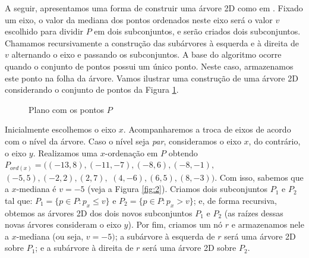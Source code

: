 A seguir, apresentamos uma forma de construir uma árvore 2D como em \cite{cg08}.
Fixado um eixo, o valor da mediana dos pontos ordenados neste eixo será o valor $v$ escolhido para dividir $P$ em dois subconjuntos, e serão criados dois subconjuntos. Chamamos recursivamente a construção das subárvores à esquerda e à direita de $v$ alternando o eixo e passando os subconjuntos. A base do algoritmo ocorre quando o conjunto de pontos possui um único ponto. Neste caso, armazenamos este ponto na folha da árvore.  Vamos ilustrar uma construção de uma árvore 2D considerando o conjunto de pontos da Figura \ref{fig:1}.
\begin{figure}[h!]
    \centering
    \caption{Plano com os pontos $P$}
    \label{fig:1}
\end{figure}

Inicialmente escolhemos o eixo $x$. Acompanharemos a troca de eixos de acordo com o nível da árvore. Caso o nível seja \emph{par}, consideramos o eixo $x$, do contrário, o eixo $y$.
Realizamos uma $x$-ordenação em $P$ obtendo $P_{ord(x)} = ((-13,8), (-11,-7), (-8,6), (-8,-1),$ $(-5,5), (-2, 2), (2,7),$ $ (4,-6),(6,5),(8,-3))$. Com isso, sabemos que a $x$-mediana é $v = -5$ (veja a Figura \ref{fig:2}). Criamos dois subconjuntos $P_1$ e $P_2$ tal que: $P_1 = \{p \in P : p_x \leq v\}$ e $P_2 = \{p \in P : p_x > v\}$; e, de forma recursiva, obtemos as árvores 2D dos dois novos subconjuntos $P_1$ e $P_2$ (as raízes dessas novas árvores consideram o eixo $y$). Por fim, criamos um nó $r$ e armazenamos nele a $x$-mediana (ou seja, $v=-5)$; a subárvore à esquerda de $r$ será uma árvore 2D sobre $P_1$; e a subárvore à direita de $r$ será uma árvore 2D sobre $P_2$. %

